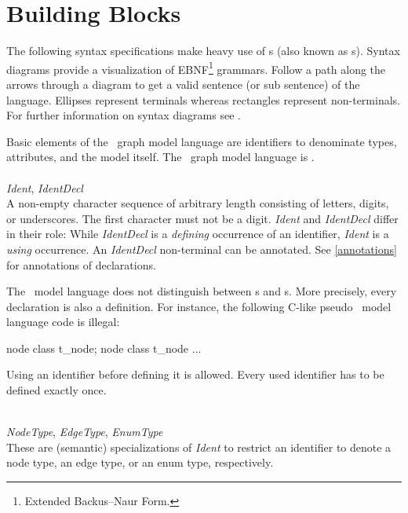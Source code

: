 \section{Building Blocks}
\label{modelbb}

\begin{note}
The following syntax specifications make heavy use of s (also known as s). Syntax diagrams provide a visualization of EBNF\footnote{Extended Backus–Naur Form.} grammars. Follow a path along the arrows through a diagram to get a valid sentence (or sub sentence) of the language. Ellipses represent terminals whereas rectangles represent non-terminals. For further information on syntax diagrams see \cite{MMJW:91}.
\end{note}
Basic elements of the \GrG\ graph model language are identifiers to denominate types, attributes, and the model itself. The \GrG\ graph model language is .\\
\\
\emph{Ident}, \emph{IdentDecl}\\ \nopagebreak
A non-empty character sequence of arbitrary length consisting of letters, digits, or underscores. The first character must not be a digit. \emph{Ident} and \emph{IdentDecl} differ in their role: While \emph{IdentDecl} is a \emph{defining} occurrence of an identifier, \emph{Ident} is a \emph{using} occurrence. An \emph{IdentDecl} non-terminal can be annotated. See \ref{annotations} for annotations of declarations.
\begin{note}
\label{note:modeldecl}
  The \GrG\ model language does not distinguish between s and s. More precisely, every declaration is also a definition. For instance, the following C-like pseudo \GrG\ model language code is illegal:
\begin{grgen}
node class t_node;
node class t_node {
  ...
}
\end{grgen}
Using an identifier before defining it is allowed. Every used identifier has to be defined exactly once.
\end{note}
\mbox{ }\\
\emph{NodeType}, \emph{EdgeType}, \emph{EnumType}\\ \nopagebreak
These are (semantic) specializations of \emph{Ident} to restrict an identifier to denote a node type, an edge type, or an enum type, respectively.

